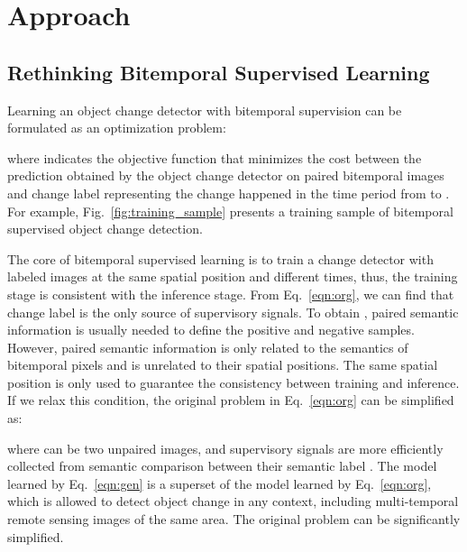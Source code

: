 \documentclass[10pt,twocolumn,letterpaper]{article}
\begin{document}
\section{Approach}
\label{sec:method}
\subsection{Rethinking Bitemporal Supervised Learning}
Learning an object change detector with bitemporal supervision can be formulated as an optimization problem:

where  indicates the objective function that minimizes the cost between the prediction obtained by the object change detector  on paired bitemporal images  and change label  representing the change happened in the time period from  to .
For example, Fig.~\ref{fig:training_sample} presents a training sample of bitemporal supervised object change detection.

The core of bitemporal supervised learning is to train a change detector with labeled images at the same spatial position and different times, thus, the training stage is consistent with the inference stage.
From Eq.~\ref{eqn:org}, we can find that change label  is the only source of supervisory signals.
To obtain , paired semantic information is usually needed to define the positive and negative samples. 
However, paired semantic information is only related to the semantics of bitemporal pixels and is unrelated to their spatial positions.
The same spatial position is only used to guarantee the consistency between training and inference.  
If we relax this condition, the original problem in Eq.~\ref{eqn:org} can be simplified as:

where  can be two unpaired images, and supervisory signals are more efficiently collected from semantic comparison between their semantic label .
The model learned by Eq.~\ref{eqn:gen} is a superset of the model learned by Eq.~\ref{eqn:org}, which is allowed to detect object change in any context, including multi-temporal remote sensing images of the same area.
The original problem can be significantly simplified.
\end{document}

